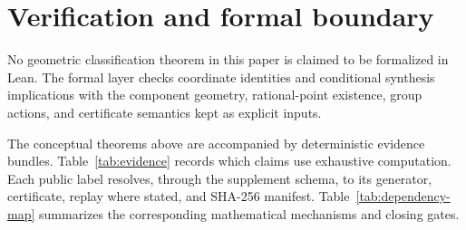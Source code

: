 \section{Verification and formal boundary}\label{sec:verification}

No geometric classification theorem in this paper is claimed to be
formalized in Lean.  The formal layer checks coordinate identities and
conditional synthesis implications with the component geometry,
rational-point existence, group actions, and certificate semantics
kept as explicit inputs.

The conceptual theorems above are accompanied by deterministic evidence
bundles.  Table~\ref{tab:evidence} records which claims use exhaustive
computation.  Each public label resolves, through the supplement
schema, to its generator, certificate, replay where stated, and
SHA-256 manifest.  Table~\ref{tab:dependency-map} summarizes the corresponding
mathematical mechanisms and closing gates.

